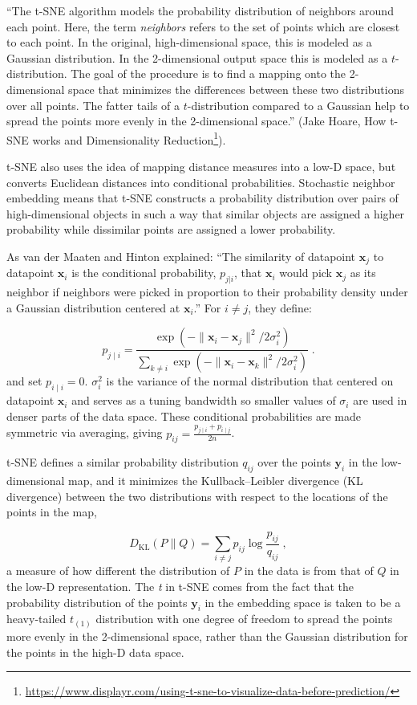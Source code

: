 \documentclass[
  letterpaper,
  10pt,
  krantz2]{krantz}
\providecommand{\href}[2]{#2\footnote{\url{#1}}}
\begin{document}
``The t-SNE algorithm models the probability distribution of neighbors
around each point. Here, the term \emph{neighbors} refers to the set of
points which are closest to each point. In the original,
high-dimensional space, this is modeled as a Gaussian distribution. In
the 2-dimensional output space this is modeled as a \(t\)-distribution.
The goal of the procedure is to find a mapping onto the 2-dimensional
space that minimizes the differences between these two distributions
over all points. The fatter tails of a \(t\)-distribution compared to a
Gaussian help to spread the points more evenly in the 2-dimensional
space.'' (Jake Hoare,
\href{https://www.displayr.com/using-t-sne-to-visualize-data-before-prediction/}{How
t-SNE works and Dimensionality Reduction}).

t-SNE also uses the idea of mapping distance measures into a low-D
space, but converts Euclidean distances into conditional probabilities.
Stochastic neighbor embedding means that t-SNE constructs a probability
distribution over pairs of high-dimensional objects in such a way that
similar objects are assigned a higher probability while dissimilar
points are assigned a lower probability.

As van der Maaten and Hinton explained: ``The similarity of datapoint
\(\mathbf{x}_{j}\) to datapoint \(\mathbf{x}_{i}\) is the conditional
probability, \(p_{j|i}\), that \(\mathbf{x}_{i}\) would pick
\(\mathbf{x}_{j}\) as its neighbor if neighbors were picked in
proportion to their probability density under a Gaussian distribution
centered at \(\mathbf{x}_{i}\).'' For \(i \ne j\), they define:

\[
p_{j\mid i} = \frac{\exp(-\lVert\mathbf{x}_i - \mathbf{x}_j\rVert^2 / 2\sigma_i^2)}{\sum_{k \neq i} \exp(-\lVert\mathbf{x}_i - \mathbf{x}_k\rVert^2 / 2\sigma_i^2)} \;. 
\] and set \(p_{i\mid i} = 0\). \(\sigma^2_i\) is the variance of the
normal distribution that centered on datapoint \(\mathbf{x}_{i}\) and
serves as a tuning bandwidth so smaller values of \(\sigma _{i}\) are
used in denser parts of the data space. These conditional probabilities
are made symmetric via averaging, giving
\(p_{ij} = \frac{p_{j\mid i} + p_{i\mid j}}{2n}\).

t-SNE defines a similar probability distribution \(q_{ij}\) over the
points \(\mathbf{y}_i\) in the low-dimensional map, and it minimizes the
Kullback--Leibler divergence (KL divergence) between the two
distributions with respect to the locations of the points in the map,

\[
D_\mathrm{KL}\left(P \parallel Q\right) = \sum_{i \neq j} p_{ij} \log \frac{p_{ij}}{q_{ij}} \; ,
\] a measure of how different the distribution of \(P\) in the data is
from that of \(Q\) in the low-D representation. The \emph{t} in t-SNE
comes from the fact that the probability distribution of the points
\(\mathbf{y}_i\) in the embedding space is taken to be a heavy-tailed
\(t_{(1)}\) distribution with one degree of freedom to spread the points
more evenly in the 2-dimensional space, rather than the Gaussian
distribution for the points in the high-D data space.
\end{document}
